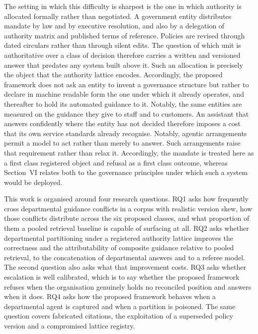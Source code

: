 \documentclass[journal]{IEEEtran}
\begin{document}
The setting in which this difficulty is sharpest is the one in which authority is allocated formally rather than negotiated. A government entity distributes mandate by law and by executive resolution, and also by a delegation of authority matrix and published terms of reference. Policies are revised through dated circulars rather than through silent edits. The question of which unit is authoritative over a class of decision therefore carries a written and versioned answer that predates any system built above it. Such an allocation is precisely the object that the authority lattice encodes. Accordingly, the proposed framework does not ask an entity to invent a governance structure but rather to declare in machine readable form the one under which it already operates, and thereafter to hold its automated guidance to it. Notably, the same entities are measured on the guidance they give to staff and to customers. An assistant that answers confidently where the entity has not decided therefore imposes a cost that its own service standards already recognise. Notably, agentic arrangements permit a model to act rather than merely to answer. Such arrangements raise that requirement rather than relax it. Accordingly, the mandate is treated here as a first class registered object and refusal as a first class outcome, whereas Section~VI relates both to the governance principles under which such a system would be deployed.

This work is organised around four research questions. RQ1 asks how frequently cross departmental guidance conflicts in a corpus with realistic version skew, how those conflicts distribute across the six proposed classes, and what proportion of them a pooled retrieval baseline is capable of surfacing at all. RQ2 asks whether departmental partitioning under a registered authority lattice improves the correctness and the attributability of composite guidance relative to pooled retrieval, to the concatenation of departmental answers and to a referee model. The second question also asks what that improvement costs. RQ3 asks whether escalation is well calibrated, which is to say whether the proposed framework refuses when the organisation genuinely holds no reconciled position and answers when it does. RQ4 asks how the proposed framework behaves when a departmental agent is captured and when a partition is poisoned. The same question covers fabricated citations, the exploitation of a superseded policy version and a compromised lattice registry.
\end{document}
